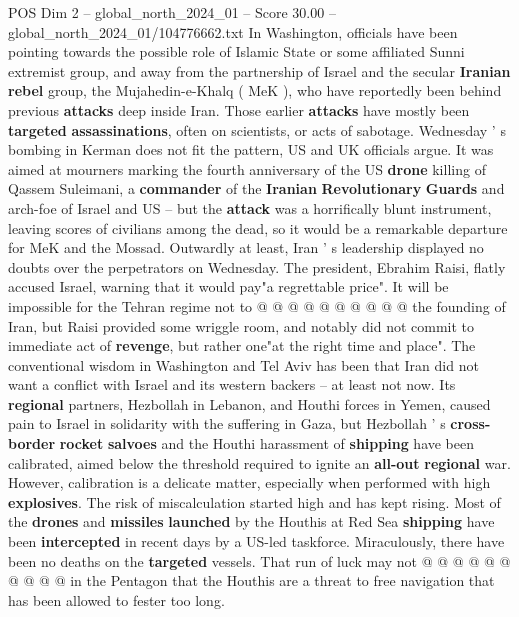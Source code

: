 \begin{textsample}{POS Dim 2 – global\_north\_2024\_01 – Score 30.00 – global\_north\_2024\_01/104776662.txt}  \label{ex:f2_pos_101}
In Washington, officials have been pointing towards the possible role of Islamic State or some affiliated Sunni extremist group, and away from the partnership of Israel and the secular \textbf{Iranian} \textbf{rebel} group, the Mujahedin-e-Khalq ( MeK ), who have reportedly been behind previous \textbf{attacks} deep inside Iran.
Those earlier \textbf{attacks} have mostly been \textbf{targeted} \textbf{assassinations}, often on scientists, or acts of sabotage.
Wednesday ' s bombing in Kerman does not fit the pattern, US and UK officials argue.
It was aimed at mourners marking the fourth anniversary of the US \textbf{drone} killing of Qassem Suleimani, a \textbf{commander} of the \textbf{Iranian} \textbf{Revolutionary} \textbf{Guards} and arch-foe of Israel and US -- but the \textbf{attack} was a horrifically blunt instrument, leaving scores of civilians among the dead, so it would be a remarkable departure for MeK and the Mossad.
Outwardly at least, Iran ' s leadership displayed no doubts over the perpetrators on Wednesday.
The president, Ebrahim Raisi, flatly accused Israel, warning that it would pay"a regrettable price".
It will be impossible for the Tehran regime not to @ @ @ @ @ @ @ @ @ @ the founding of Iran, but Raisi provided some wriggle room, and notably did not commit to immediate act of \textbf{revenge}, but rather one"at the right time and place".
The conventional wisdom in Washington and Tel Aviv has been that Iran did not want a conflict with Israel and its western backers -- at least not now.
Its \textbf{regional} partners, Hezbollah in Lebanon, and Houthi forces in Yemen, caused pain to Israel in solidarity with the suffering in Gaza, but Hezbollah ' s \textbf{cross-border} \textbf{rocket} \textbf{salvoes} and the Houthi harassment of \textbf{shipping} have been calibrated, aimed below the threshold required to ignite an \textbf{all-out} \textbf{regional} war.
However, calibration is a delicate matter, especially when performed with high \textbf{explosives}.
The risk of miscalculation started high and has kept rising.
Most of the \textbf{drones} and \textbf{missiles} \textbf{launched} by the Houthis at Red Sea \textbf{shipping} have been \textbf{intercepted} in recent days by a US-led taskforce.
Miraculously, there have been no deaths on the \textbf{targeted} vessels.
That run of luck may not @ @ @ @ @ @ @ @ @ @ in the Pentagon that the Houthis are a threat to free navigation that has been allowed to fester too long.

\end{textsample}
